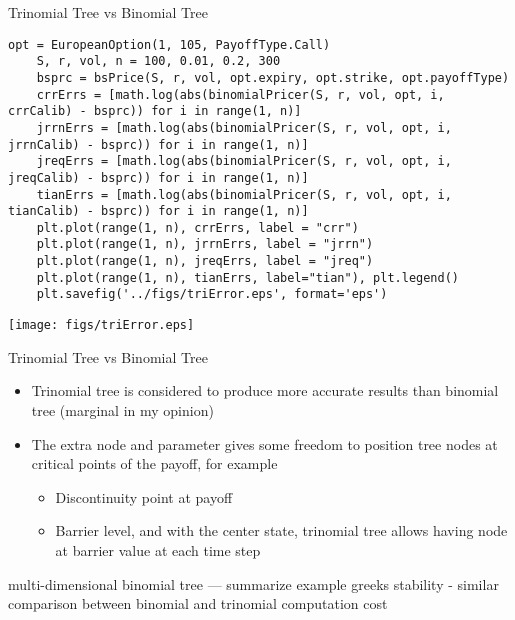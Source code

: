 \begin{frame}[fragile]{Trinomial Tree vs Binomial Tree}
\begin{lstlisting}[style=compactlst]
    opt = EuropeanOption(1, 105, PayoffType.Call)
    S, r, vol, n = 100, 0.01, 0.2, 300
    bsprc = bsPrice(S, r, vol, opt.expiry, opt.strike, opt.payoffType)
    crrErrs = [math.log(abs(binomialPricer(S, r, vol, opt, i, crrCalib) - bsprc)) for i in range(1, n)]
    jrrnErrs = [math.log(abs(binomialPricer(S, r, vol, opt, i, jrrnCalib) - bsprc)) for i in range(1, n)]
    jreqErrs = [math.log(abs(binomialPricer(S, r, vol, opt, i, jreqCalib) - bsprc)) for i in range(1, n)]
    tianErrs = [math.log(abs(binomialPricer(S, r, vol, opt, i, tianCalib) - bsprc)) for i in range(1, n)]
    plt.plot(range(1, n), crrErrs, label = "crr")
    plt.plot(range(1, n), jrrnErrs, label = "jrrn")
    plt.plot(range(1, n), jreqErrs, label = "jreq")
    plt.plot(range(1, n), tianErrs, label="tian"), plt.legend()
    plt.savefig('../figs/triError.eps', format='eps')
\end{lstlisting}
\vspace{-4mm}
\begin{center}
\texttt{[image: figs/triError.eps]}
\end{center}
\end{frame}

\begin{frame}{Trinomial Tree vs Binomial Tree}
\begin{itemize}
\item Trinomial tree is considered to produce more accurate results than binomial tree (marginal in my opinion)
\item The extra node and parameter gives some freedom to position tree nodes at critical points of the payoff, for example
\begin{itemize}
\item Discontinuity point at payoff
\item Barrier level, and with the center state, trinomial tree allows having node at barrier value at each time step
\end{itemize}
\end{itemize}
\end{frame}


\begin{frame}
    multi-dimensional binomial tree  --- summarize
    example
    greeks stability - similar
    comparison between binomial and trinomial
    computation cost
\end{frame}


